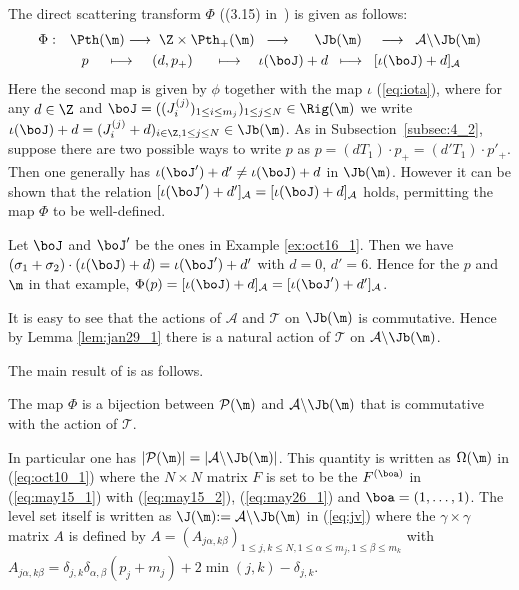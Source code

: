 The direct scattering transform $\Phi$ ((3.15) in~\cite{KTT}) is given as follows:
\begin{equation}\label{eq:pj}
\begin{split}
\Phi: \quad &\Pth(\m) \longrightarrow \;\Z \times \Pth_+(\m)\;\;
\longrightarrow \;\;\quad \Jb(\m) \;\;\;\;\longrightarrow
\;\; {{\mathcal A} \backslash \Jb (\m)}\\
&\;\;\;p \;\quad \longmapsto \;\;\;\;(d, p_+) \;\;\quad\longmapsto
\quad \iota(\boJ)+d \;\;\longmapsto \;\;[\iota(\boJ)+d]_{\mathcal A}
\end{split}
\end{equation}
Here the second map is given by $\phi$ together with the map $\iota$ {(\ref{eq:iota})}, where
for any $d \in \Z$ and $\boJ = ((J^{(j)}_i)_{1 \le i \le m_{j}})_{1 \leq j \leq N} \in \Rig(\m)$ we write
{$\iota (\boJ) + d = (J^{(j)}_i + d)_{i \in \Z, 1 \leq j \leq N} \in \Jb(\m)$}.
{As in Subsection~\ref{subsec:4_2},}
suppose there are two possible ways to write $p$ as  $p =(d T_1) \cdot p_+ = (d' T_1) \cdot p'_+$.
{Then one generally has $\iota(\boJ')+d' \ne \iota(\boJ)+d$ in $\Jb(\m)$.}
However it can be shown that the relation $[\iota(\boJ')+d']_{\mathcal A} = [\iota(\boJ)+d]_{\mathcal A}$
{holds}, permitting the map $\Phi$ to be well-def\/ined.
\begin{example}\label{ex:oct16_2}
Let $\boJ$ and $\boJ'$ be the ones in Example \ref{ex:oct16_1}.
Then we have
$(\sigma_1 + \sigma_2) \cdot (\iota (\boJ) + d) = \iota (\boJ') + d'$ with $d=0$, $d'=6$.
Hence for the $p$ and $\m$ in that example,
{$\Phi (p) = [\iota (\boJ) + d]_{\mathcal A} = [\iota (\boJ') + d']_{\mathcal A}$}.
\end{example}

It is easy to see that the actions of ${\mathcal A}$ and ${\mathcal T}$ on $\Jb(\m)$ is commutative.
Hence by Lemma \ref{lem:jan29_1} there is a natural action of ${\mathcal T}$ on ${\mathcal A} \backslash \Jb (\m)$.

The main result of \cite{KTT} is as follows.
\begin{proposition}\label{prop:ktt}
The map $\Phi$ is a bijection
between ${\mathcal P}(\m)$ and ${\mathcal A} \backslash \Jb (\m)$
that is commutative with the action of ${\mathcal T}$.
\end{proposition}


In particular one has $|{\mathcal P}(\m)| = |{\mathcal A} \backslash \Jb (\m)|$.
This quantity is written as $\Omega (\m)$ in (\ref{eq:oct10_1}) where the $N \times N$ matrix
$F$ is set to be the $F^{(\boa)}$ in (\ref{eq:may15_1}) with (\ref{eq:may15_2}), (\ref{eq:may26_1}) and
$\boa = (1,\ldots,1)$.
The level set itself is written as $\J (\m) {:= {\mathcal A} \backslash \Jb (\m)}$ in (\ref{eq:jv}) where the
$\gamma \times \gamma$ matrix $A$ is def\/ined by $A = (A_{j\alpha,k\beta})_{1 \leq j,k \leq N, 1 \leq \alpha \leq m_j, 1 \leq \beta \leq m_k}$
with
\begin{math}
A_{j\alpha,k\beta} = \delta_{j,k} \delta_{\alpha,\beta} (p_j + m_j) + 2 \min (j,k) - \delta_{j,k}.
\end{math}


